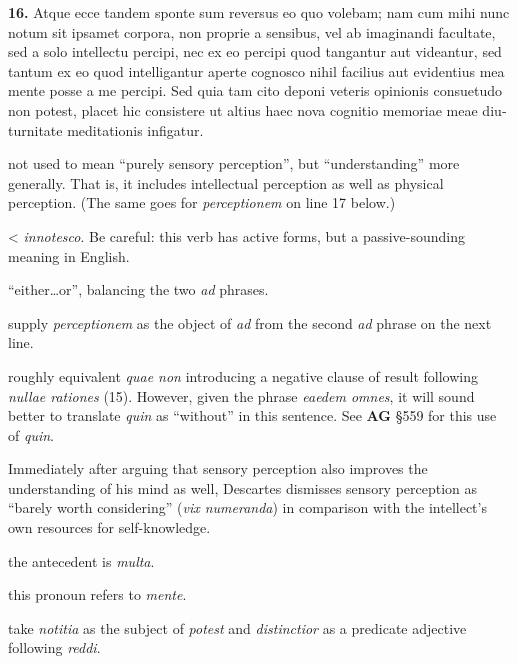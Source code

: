\beginnumbering
\pstart
\begin{latin}
    \textenglish{\textbf{16.}} Atque ecce tandem sponte sum reversus eo quo volebam; nam cum mihi nunc notum sit ipsamet corpora, non proprie a sensibus, vel ab imaginandi facultate, sed a solo intellectu percipi, nec ex eo percipi quod tangantur aut videantur, sed tantum ex eo quod intelligantur aperte cognosco nihil facilius aut evidentius mea mente posse a me percipi. Sed quia tam cito deponi veteris opinionis consuetudo non potest, placet hic consistere ut altius haec nova cognitio memoriae meae diuturnitate meditationis infigatur.
\end{latin}
\pend
\endnumbering

\prenotes

 not used to mean ``purely sensory perception'', but ``understanding'' more generally. That is, it includes intellectual perception as well as physical perception. (The same goes for \textit{perceptionem} on line 17 below.)

 < \textit{innotesco}. Be careful: this verb has active forms, but a passive-sounding meaning in English.

 ``either\dots or'', balancing the two \textit{ad} phrases.

 supply \textit{perceptionem} as the object of \textit{ad} from the second \textit{ad} phrase on the next line.

 roughly equivalent \textit{quae non} introducing a negative clause of result following \textit{nullae rationes} (15). However, given the phrase \textit{eaedem omnes}, it will sound better to translate \textit{quin} as ``without'' in this sentence. See \textbf{AG} §559 for this use of \textit{quin}.

 Immediately after arguing that sensory perception also improves the understanding of his mind as well, Descartes dismisses sensory perception as ``barely worth considering'' (\textit{vix numeranda}) in comparison with the intellect's own resources for self-knowledge.

 the antecedent is \textit{multa}.

 this pronoun refers to \textit{mente}.

 take \textit{notitia} as the subject of \textit{potest} and \textit{distinctior} as a predicate adjective following \textit{reddi}.

